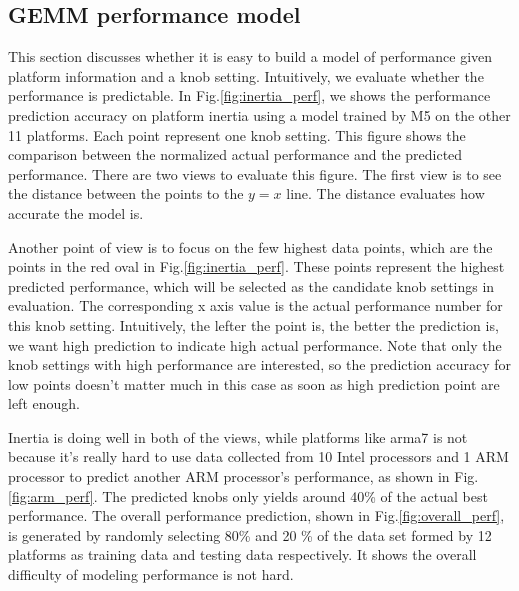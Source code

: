   \subsection{GEMM performance model}
  \label{sec:GEMMperf}
  This section discusses whether it is easy to build a model of \gem performance
  given platform information and a knob setting. Intuitively, we evaluate
  whether the \gem performance is predictable. In Fig.\ref{fig:inertia_perf},
  we shows the performance prediction accuracy on platform inertia using a model
  trained by M5 on the other 11 platforms. Each point represent one knob
  setting. This figure shows the comparison between the normalized actual
  performance and the predicted performance. There are two views to evaluate
  this figure. The first view is to see the distance between the points to the
  $y=x$ line. The distance evaluates how accurate the model is.

  Another point of
  view is to focus on the few highest data points, which are the points in the
  red oval in Fig.\ref{fig:inertia_perf}. These points represent the highest
  predicted performance, which will be selected as the candidate knob settings
  in \atl evaluation. The corresponding x axis value is the actual performance
  number for this knob setting. Intuitively, the lefter the point is, the
  better the prediction is, we want high prediction to indicate high actual
  performance. Note that only the knob settings with high performance are
  interested, so the prediction accuracy for low points doesn't matter much in
  this case as soon as high prediction point are left enough.

  Inertia is doing well in both of the views, while platforms like arma7 is not
  because it's really hard to use data collected from 10 Intel processors and 1
  ARM processor to predict another ARM processor's performance, as shown in
  Fig.\ref{fig:arm_perf}. The predicted knobs only yields around 40\% of the
  actual best performance.
  The overall performance prediction, shown in
  Fig.\ref{fig:overall_perf}, is generated by randomly selecting 80\% and 20 \%
  of the data set formed by 12 platforms as training data and testing data
  respectively. It shows the overall difficulty of modeling \gem performance
  is not hard.

